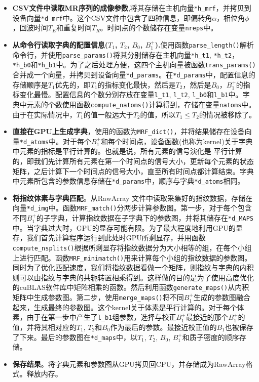 \begin{itemize}
\item \textbf{CSV文件中读取MR序列的成像参数},将其存储在主机向量\texttt{*h\_mrf}，并拷贝到设备向量\texttt{*d\_mrf}中。这个CSV文件中包含了四种信息，即偏转角$\alpha$，相位角$\phi$，回波时间$T_E$和重复时间$T_R$。时间点的个数储存在变量\texttt{nreps}中。

\item \textbf{从命令行读取字典的配置信息($T_1$, $T_2$, $B_0$, $B_1^+$).}使用函数\texttt{parse\_length()}解析命令行，并使用\texttt{parse\_params()}将其分别储存在主机向量\texttt{*h\_t1}, \texttt{*h\_t2}，\texttt{*h\_b0}和\texttt{*h\_b1}中。为了之后处理方便，这四个主机向量被函数\texttt{trans\_params()}合并成一个向量，并拷贝到设备向量\texttt{*d\_params}。在\texttt{*d\_params}中，配置信息的存储顺序是$T_1$优先的，即$T_1$的指标变化最快，然后是$T_2$，然后是$B_0$，$B_1^+$的指标变化最慢。配置信息的个数分别存放在变量\texttt{l\_t1}, \texttt{l\_t2}, \texttt{l\_b0}和\texttt{l\_b1}中。字典中元素的个数使用函数\texttt{compute\_natoms()}计算得到，存储在变量\texttt{natoms}中。由于在实际情况中，$T_1$的值一般远大于$T_2$的值，所以$T_1 \le T_2$的情况被移除了。

\item \textbf{直接在GPU上生成字典}，使用的函数为\texttt{MRF\_dict()}，并将结果储存在设备向量\texttt{*d\_atoms}中。对于每个$B_1^+$和每个时间点，设备函数(也称为kernel)关于字典中元素的指标是平行计算的。也就是说，所有元素的信号演化是
	平行计算的，即我们先计算所有元素在第一个时间点的信号大小，更新每个元素的状态矩阵，之后计算下一个时间点的信号大小，直至所有时间点都计算结束。字典中元素所包含的参数信息存储在\texttt{*d\_params}中，顺序与字典\texttt{*d\_atoms}相同。

\item \textbf{将指纹体素与字典匹配}。从RawArray \cite{RawArray}文件中读取采集好的指纹数据，存储在向量\texttt{*d\_img}中。函数\texttt{MRF\_match()}分两步计算参数图。第一步，对于每个包含不同$B_1^+$的子字典，计算指纹数据在子字典下的参数图，并将其储存在\texttt{*d\_MAPS}中。当字典过大时，GPU的显存可能有限。为了最大程度地利用GPU的显存，我们首先计算程序运行到此处时GPU所剩显存，并用函数\texttt{compute\_nsplits()}根据所剩显存将指纹数据分为大小相等的组，在每个小组上进行匹配。函数\texttt{MRF\_minimatch()}用来计算每个小组的指纹数据的参数图。同时为了优化匹配速度，我们将指纹数据看做一个矩阵，则指纹与字典的内积则可以由指纹与字典的共轭转置相乘得到。这样做的目的是为了使用高度优化的cuBLAS软件库中矩阵相乘的函数。然后利用函数\texttt{generate\_maps()}从内积矩阵中生成参数图。第二步，使用\texttt{merge\_maps()}将不同$B_1^+$生成的参数图融合起来，生成最终的参数图。这个kernel关于体素是平行计算的。对于每个体素，由于在第一步中产生了\texttt{l\_b1}组参数，选择与校正$B_1^+$最接近的那个$B_1^+$的值，并将其相对应的$T_1$, $T_2$和$B_0$作为最后的参数。最接近校正值的$B_1$也被保存了下来。最后的参数图在\texttt{*d\_maps}中，以$T_1$, $T_2$, $B_0$, $B_1^+$和质子密度的顺序存储。

\item \textbf{保存结果}。将字典元素和参数图从GPU拷贝回CPU，并存储成为RawArray格式。释放内存。

\end{itemize}
